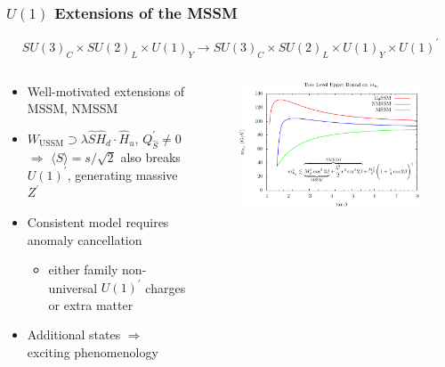 \documentclass[10pt,aspectratio=169]{beamer}
\begin{document}
\begin{frame}
  \frametitle{$U(1)$ Extensions of the MSSM}
    \begin{equation*}
      SU(3)_C \times SU(2)_L \times U(1)_Y \to
      SU(3)_C \times SU(2)_L \times U(1)_Y \times U(1)^\prime
    \end{equation*}
    \vspace{-15pt}
  \begin{columns}[t]
    \begin{column}{0.45\textwidth}
      \begin{itemize} \itemsep1em
        \item Well-motivated extensions of MSSM, NMSSM
        \item $W_{\text{USSM}} \supset \lambda \hat{S} \hat{H}_d
          \cdot \hat{H}_u$, $Q^\prime_{\hat{S}} \neq 0$ $\Rightarrow$
          $\langle S \rangle = s / \sqrt{2}$ also breaks $U(1)^\prime$,
          generating {\color{blue} massive $Z^\prime$}
        \item Consistent model requires anomaly cancellation
          \begin{itemize}
            \item either family non-universal $U(1)^\prime$ charges
              or {\color{blue} extra matter}
          \end{itemize}
        \item Additional states $\Rightarrow$ exciting phenomenology
      \end{itemize}
    \end{column}
    \begin{column}{0.6\textwidth}
      \vspace{-10pt}
      \begin{figure}
        \centering
        \includegraphics[width=\textwidth]{treelevel_higgs_upperbound_plot}
      \end{figure}
    \end{column}
  \end{columns}
\end{frame}
\end{document}

